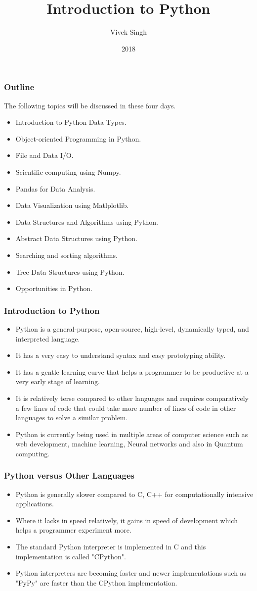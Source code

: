 \documentclass{beamer}
\title{Introduction to Python}
\author{Vivek Singh}
\institute{Information Systems Decision Sciences (ISDS)\\
MUMA College of Business\\
University of South Florida \\
Tampa, Florida}
\date{2018}
\begin{document}
 
\frame{\titlepage}

\begin{frame}
\frametitle{Outline}
The following topics will be discussed in these four days.
\begin{itemize}
\item Introduction to Python Data Types.
\item Object-oriented Programming in Python.
\item File and Data I/O.
\item Scientific computing using Numpy. 
\item Pandas for Data Analysis.
\item Data Visualization using Matlplotlib.
\item Data Structures and Algorithms using Python.
\item Abstract Data Structures using Python.
\item Searching and sorting algorithms.
\item Tree Data Structures using Python.
\item Opportunities in Python. 
\end{itemize}
\end{frame}


\begin{frame}
\frametitle{Introduction to Python}
\begin{itemize}
\item Python is a general-purpose, open-source, high-level, dynamically typed, and interpreted language.
\item It has a very easy to understand syntax and easy prototyping ability.
\item It has a gentle learning curve that helps a  programmer to be productive at a very early stage of learning.
\item It is relatively terse compared to other languages and requires comparatively  a few lines of code that could take more number of lines of code in other languages to solve a similar problem.
\item Python is currently being used in multiple areas of computer science such as web development, machine learning, Neural networks and also in Quantum computing.
\end{itemize}
\end{frame}

\begin{frame}
\frametitle{Python versus Other Languages}
\begin{itemize}
\item Python is generally slower compared to C, C++ for computationally intensive applications.
\item Where it lacks in speed relatively, it gains in speed of development which helps a programmer experiment more.
\item The standard Python interpreter is implemented in C and this implementation is called "CPython".
\item Python interpreters are becoming faster and newer implementations such as "PyPy" are faster than the CPython implementation.
\end{itemize}
\end{frame}
\end{document}
